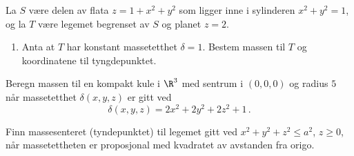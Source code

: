 

\oppgave[K2015, Oppgave 7]

La $S$ være delen av flata $z = 1 + x^2 + y^2$ som ligger inne i sylinderen $x^2
+ y^2 = 1$, og la $T$ være legemet begrenset av $S$ og planet $z = 2$.

\begin{enumerate}
  \item Anta at $T$ har konstant massetetthet $\delta = 1$. Bestem massen til
    $T$ og koordinatene til tyngdepunktet. 
\end{enumerate}

\oppgave[V2015, Oppgave 7]

Beregn massen til en kompakt kule i $\R^3$ med sentrum i $(0,0,0)$ og radius $5$
når massetetthet $\delta(x,y,z)$ er gitt ved
%
\begin{equation*}
  \delta(x,y,z) = 2x^2 + 2y^2 + 2z^2 + 1\,.
\end{equation*}


\oppgave[K2012, Oppgave 4] Finn massesenteret (tyndepunktet) til legemet gitt
ved $x^2 + y^2 + z^2 \leq a^2$, $z \geq 0$, når massetettheten er proposjonal
med kvadratet av avstanden fra origo. 
